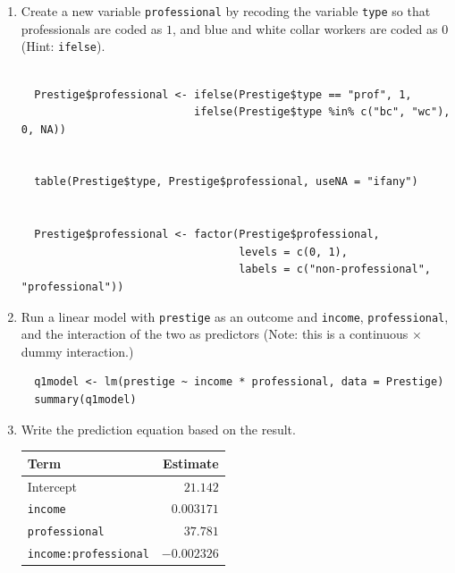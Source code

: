 \documentclass[12pt,letterpaper]{article}
\begin{document}
\newpage
\begin{enumerate}
	
	\item [(a)]
	Create a new variable \texttt{professional} by recoding the variable \texttt{type} so that professionals are coded as $1$, and blue and white collar workers are coded as $0$ (Hint: \texttt{ifelse}).
	
	\begin{lstlisting}

  Prestige$professional <- ifelse(Prestige$type == "prof", 1,
                           ifelse(Prestige$type %in% c("bc", "wc"), 0, NA))
  
  
  table(Prestige$type, Prestige$professional, useNA = "ifany")
  
  
  Prestige$professional <- factor(Prestige$professional,
                                  levels = c(0, 1),
                                  labels = c("non-professional", "professional"))
  \end{lstlisting}

	
	\vspace{6cm}
	
	
	\item [(b)]
	Run a linear model with \texttt{prestige} as an outcome and \texttt{income}, \texttt{professional}, and the interaction of the two as predictors (Note: this is a continuous $\times$ dummy interaction.)
	
  \begin{lstlisting}
  q1model <- lm(prestige ~ income * professional, data = Prestige)
  summary(q1model)
  \end{lstlisting}
	
	\vspace{6cm}
	\item [(c)]
	Write the prediction equation based on the result.
	
  \begin{center}
  \begin{tabular}{lr}
  \hline
  Term & Estimate \\
  \hline
  Intercept & $21.142$ \\
  \texttt{income} & $0.003171$ \\
  \texttt{professional} & $37.781$ \\
  \texttt{income:professional} & $-0.002326$ \\
  \hline
  \end{tabular}
  \end{center}
  

\end{enumerate}
\end{document}
